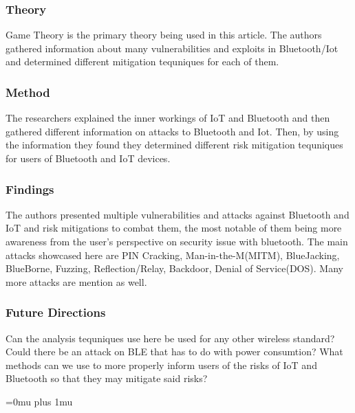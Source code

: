 \documentclass[letterpaper,12pt]{article}
\begin{document}
\subsubsection{Theory}

\noindent
Game Theory is the primary theory being used in this article.  The authors gathered information about many vulnerabilities and exploits in Bluetooth/Iot and determined different mitigation tequniques for each of them. 

\subsubsection{Method}

\noindent
The researchers explained the inner workings of IoT and Bluetooth and then gathered different information on attacks to Bluetooth and Iot. Then, by using the information they found they determined different risk mitigation tequniques for users of Bluetooth and IoT devices.

\subsubsection{Findings}

\noindent
The authors presented multiple vulnerabilities and attacks against Bluetooth and IoT and risk mitigations to combat them, the most notable of them being more awareness from the user's perspective on security issue with bluetooth. The main attacks showcased here are PIN Cracking, Man-in-the-M(MITM), BlueJacking, BlueBorne, Fuzzing, Reflection/Relay, Backdoor, Denial of Service(DOS). Many more attacks are mention as well.

\subsubsection{Future Directions}

\noindent
Can the analysis tequniques use here be used for any other wireless standard? Could there be an attack on BLE that has to do with power consumtion? What methods can we use to more properly inform users of the risks of IoT and Bluetooth so that they may mitigate said risks?

\Urlmuskip=0mu plus 1mu\relax

\pagebreak


\end{document}

